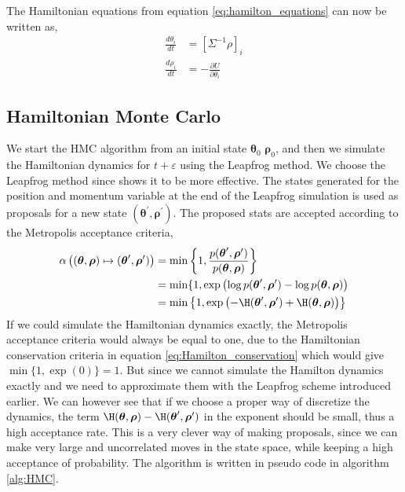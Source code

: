 The Hamiltonian equations from equation \ref{eq:hamilton_equations} can now be written as,
\begin{equation*}
\begin{split}
\frac{d \theta_{i}}{d t}&=\left[\Sigma^{-1}\rho\right]_i \\
\frac{d \rho_{i}}{d t}&=-\frac{\partial U}{\partial \theta_i}
\end{split}
\end{equation*}





\subsection{Hamiltonian Monte Carlo}
We start the HMC algorithm from an initial state $\boldsymbol{\theta}_0$ $\boldsymbol{\rho}_0$, and then we simulate the Hamiltonian dynamics for $t+\varepsilon$ using the Leapfrog method. We choose the Leapfrog method since \cite{betancourt2017conceptual} shows it to be more effective. The states generated for the position and momentum variable at the end of the Leapfrog simulation is used as proposals for a new state $(\boldsymbol{\theta}^\prime,\boldsymbol{\rho}^\prime)$. The proposed stats are accepted according to the Metropolis acceptance criteria,
\begin{equation*}
\begin{split}
    \alpha\left((\boldsymbol{\theta},\boldsymbol{\rho}) \mapsto (\boldsymbol{\theta}^\prime , \boldsymbol{\rho}^\prime )\right) &= \min\left\{1, \frac{p(\boldsymbol{\theta}^\prime,\boldsymbol{\rho}^\prime)}{p(\boldsymbol{\theta},\boldsymbol{\rho})} \right\}\\
    &= \min\{1,\exp\left(\log p(\boldsymbol{\theta}^\prime,\boldsymbol{\rho}^\prime)- \log p(\boldsymbol{\theta}, \boldsymbol{\rho})  \right)\\
    &= \min \left\{1,\exp\left(-\H(\boldsymbol{\theta}^\prime,\boldsymbol{\rho}^\prime) +\H(\boldsymbol{\theta},\boldsymbol{\rho})\right) \right\}
\end{split}
\end{equation*}
If we could simulate the Hamiltonian dynamics exactly, the Metropolis acceptance criteria would always be equal to one, due to the Hamiltonian conservation criteria in equation \ref{eq:Hamilton_conservation} which would give $\min \{1, \exp (0)\}=1$. But since we cannot simulate the Hamilton dynamics exactly and we need to approximate them with the Leapfrog scheme introduced earlier. We can however see that if we choose a proper way of discretize the dynamics, the term  $\H(\boldsymbol{\theta},\boldsymbol{\rho})-\H(\boldsymbol{\theta}^\prime,\boldsymbol{\rho}^\prime)$ in the exponent should be small, thus a high acceptance rate. This is a very clever way of making proposals, since we can make very large and uncorrelated moves in the state space, while keeping a high acceptance of probability. The algorithm is written in pseudo code in algorithm \ref{alg:HMC}. \\
